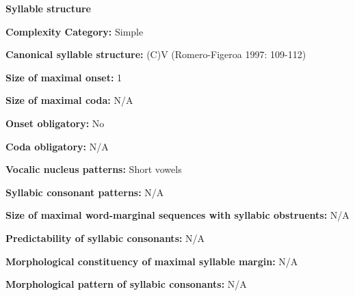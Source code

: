 \begin{styleBody}
\textbf{Syllable structure}
\end{styleBody}

\begin{styleBody}
\textbf{Complexity Category:} Simple
\end{styleBody}

\begin{styleBody}
\textbf{Canonical syllable structure:} (C)V\textbf{ }(Romero-Figeroa 1997: 109-112)
\end{styleBody}

\begin{styleBody}
\textbf{Size of maximal onset:} 1
\end{styleBody}

\begin{styleBody}
\textbf{Size of maximal coda:} N/A
\end{styleBody}

\begin{styleBody}
\textbf{Onset obligatory:} No
\end{styleBody}

\begin{styleBody}
\textbf{Coda obligatory:} N/A
\end{styleBody}

\begin{styleBody}
\textbf{Vocalic nucleus patterns:} Short vowels
\end{styleBody}

\begin{styleBody}
\textbf{Syllabic consonant patterns:} N/A
\end{styleBody}

\begin{styleBody}
\textbf{Size of maximal word{}-marginal sequences with syllabic obstruents:} N/A
\end{styleBody}

\begin{styleBody}
\textbf{Predictability of syllabic consonants:} N/A
\end{styleBody}

\begin{styleBody}
\textbf{Morphological constituency of maximal syllable margin:} N/A
\end{styleBody}

\begin{styleBody}
\textbf{Morphological pattern of syllabic consonants:} N/A
\end{styleBody}

